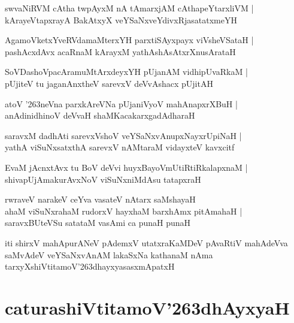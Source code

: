 \documentclass[twoside,12pt,openright]{book}
\def\S{\char'263}
\newcounter{shloka}[chapter]
\begin{document}
\begin{shloka}%
swvaNiRVM cAtha twpAyxM nA tAmarxjAM cAthapeYtarxliVM |\\
kArayeVtapxrayA BakAtxyX veYSaNxveYdivxRjasatatxmeYH 
\end{shloka}

\begin{shloka}%
AgamoVketxYveRVdamaMterxYH parxtiSAyxpayx viVsheVSataH |\\
pashAcxdAvx acaRnaM kArayxM yathAshAsAtxrXnusArataH 
\end{shloka}

\begin{shloka}%
SoVDashoVpacAramuMtArxdeyxYH pUjanAM vidhipUvaRkaM |\\
pUjiteV tu jaganAnxtheV sarevxV deVvAshacx pUjitAH 
\end{shloka}

\begin{shloka}%
atoV \S neVna parxkAreVNa pUjaniVyoV mahAnapxrXBuH |\\
anAdinidhinoV deVvaH shaMKacakarxgadAdharaH
\end{shloka}

\begin{shloka}%
saravxM dadhAti sarevxVshoV veYSaNxvAnupxNayxrUpiNaH |\\
yathA viSuNxsatxthA sarevxV nAMtaraM vidayxteV kavxcitf
\end{shloka}

\begin{shloka}%
EvaM jAcnxtAvx tu BoV deVvi huyxBayoVmUtiRtiRkalapxnaM |\\
shivapUjAmakurAvxNoV viSuNxniMdAsu tatapxraH 
\end{shloka}

\begin{shloka}%
rwraveV narakeV ceYva vasateV nAtarx saMshayaH \\
ahaM viSuNxrahaM rudorxV hayxhaM barxhAmx pitAmahaH |\\
saravxBUteVSu satataM vasAmi ca punaH punaH
\end{shloka}

\begin{center}
iti shirxV mahApurANeV pAdemxV utatxraKaMDeV pAvaRtiV mahAdeVva saMvAdeV veYSaNxvAnAM lakaSxNa 
kathanaM nAma tarxyXshiVtitamoV\S dhayxyasasxmApatxH 
\end{center}

\chapter{caturashiVtitamoV\S dhAyxyaH}
\end{document}
